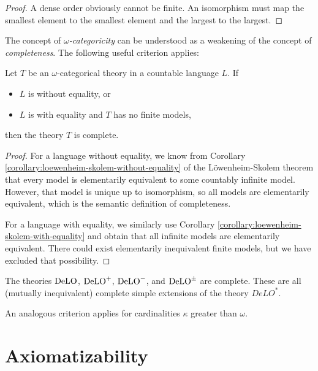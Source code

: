 \begin{proof}
A dense order obviously cannot be finite. An isomorphism must map the smallest element to the smallest element and the largest to the largest.
\end{proof}

The concept of \emph{$\omega$-categoricity} can be understood as a weakening of the concept of \emph{completeness}. The following useful criterion applies:

\begin{theorem}
Let $T$ be an $\omega$-categorical theory in a countable language $L$. If
\begin{itemize}
    \item $L$ is without equality, or
    \item $L$ is with equality and $T$ has no finite models,
\end{itemize}
then the theory $T$ is complete.
\end{theorem}
\begin{proof}
For a language without equality, we know from Corollary \ref{corollary:loewenheim-skolem-without-equality} of the Löwenheim-Skolem theorem that every model is elementarily equivalent to some countably infinite model. However, that model is unique up to isomorphism, so all models are elementarily equivalent, which is the semantic definition of completeness.

For a language with equality, we similarly use Corollary \ref{corollary:loewenheim-skolem-with-equality} and obtain that all infinite models are elementarily equivalent. There could exist elementarily inequivalent finite models, but we have excluded that possibility.
\end{proof}

\begin{corollary}\label{corollary:complete-simple-extensions-of-delo}
    The theories $\operatorname{DeLO}$, $\operatorname{DeLO}^+$, $\operatorname{DeLO}^-$, and $\operatorname{DeLO}^\pm$ are complete. These are all (mutually inequivalent) complete simple extensions of the theory $DeLO^*$.
\end{corollary}

\begin{remark}
An analogous criterion applies for cardinalities $\kappa$ greater than $\omega$.
\end{remark}

\section{Axiomatizability}\label{section:axiomatizability}

